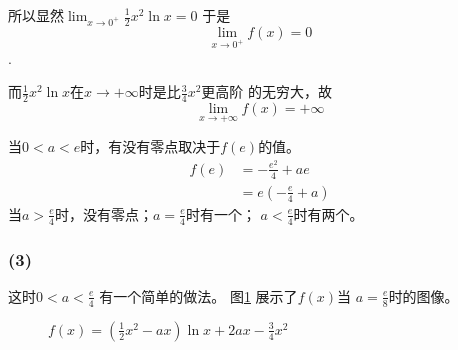 所以显然\(\lim_{x \rightarrow 0^{+}}{\frac{1}{2}x^2\ln{x}} = 0\)
于是
\begin{equation}
\lim_{x \rightarrow 0^+}{f(x)} = 0
\end{equation}.

而\(\frac{1}{2}x^2\ln{x}\)在\(x \rightarrow +\infty\)时是比\(\frac{3}{4}x^2\)更高阶
的无穷大，故
\begin{equation}
\lim_{x \rightarrow +\infty}{f(x)} = +\infty
\end{equation}

当\(0 < a < e\)时，有没有零点取决于\(f(e)\)的值。
\begin{align*}
f(e) 
&= -\frac{e^2}{4} + ae\\
&= e(-\frac{e}{4} + a)
\end{align*}
当\(a > \frac{e}{4}\)时，没有零点；\(a = \frac{e}{4}\)时有一个；
\(a < \frac{e}{4}\)时有两个。

\subsubsection{(3)}
这时\(0 < a < \frac{e}{4}\)
有一个简单的做法。
图\ref{fig:dfdx} 展示了\(f(x)\)当
\(a=\frac{e}{8}\)时的图像。

\begin{figure}[!htbp]
\begin{center}
\end{center}
\caption{\(f(x) = (\frac{1}{2}x^2 - ax)\ln{x} + 2ax - \frac{3}{4}x^2\)}
\label{fig:dfdx}
\end{figure}

